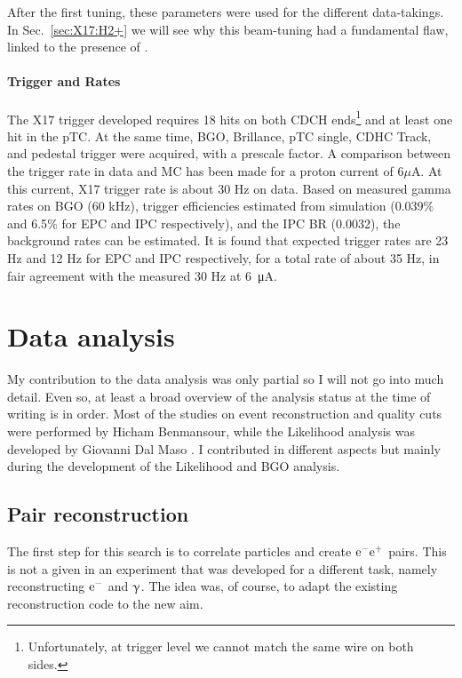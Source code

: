 \begin{refsection}
        \noindent
        After the first tuning, these parameters were used for the different data-takings. 
        In Sec.~\ref{sec:X17:H2+} we will see why this beam-tuning had a fundamental flaw, linked to the presence of .

        \paragraph{Trigger and Rates}
        The X17 trigger developed requires 18 hits on both CDCH ends\footnote{Unfortunately, at trigger level we cannot match the same wire on both sides.} and at least one hit in the pTC. 
        At the same time, BGO, Brillance, pTC single, CDHC Track, and pedestal trigger were acquired, with a prescale factor. 
        A comparison between the trigger rate in data and MC has been made for a proton current of 6$\mu$A. 
        At this current, X17 trigger rate is about 30 Hz on data.
        Based on measured gamma rates on BGO (60 kHz), trigger efficiencies estimated from simulation (0.039$\%$ and 6.5$\%$ for EPC and IPC respectively), and the IPC BR (0.0032), the background rates can be estimated. 
        It is found that expected trigger rates are 23 Hz and 12 Hz for EPC and IPC respectively, for a total rate of about 35 Hz, in fair agreement with the measured 30 Hz at \SI{6}{\micro\ampere}.
        
\section{Data analysis}
    My contribution to the data analysis was only partial so I will not go into much detail. 
    Even so, at least a broad overview of the analysis status at the time of writing is in order.
    Most of the studies on event reconstruction and quality cuts were performed by Hicham Benmansour, while the Likelihood analysis was developed by Giovanni Dal Maso \cite{Giovanni}. 
    I contributed in different aspects but mainly during the development of the Likelihood and BGO analysis.

    \subsection{Pair reconstruction}
        The first step for this search is to correlate particles and create $\text{e}^- \text{e}^+$ pairs. 
        This is not a given in an experiment that was developed for a different task, namely reconstructing $\text{e}^-$ and $\upgamma$. 
        The idea was, of course, to adapt the existing reconstruction code to the new aim.
        

\end{refsection}
